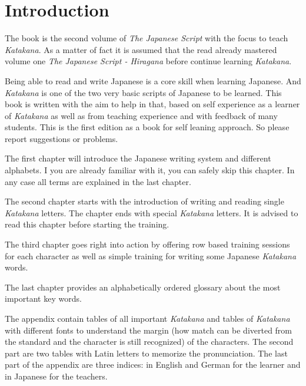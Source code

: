 \chapter*{Introduction}

The book is the second volume of \textit{The Japanese Script} with the focus to
teach \textit{Katakana}. As a matter of fact it is assumed that the read
already mastered volume one \textit{The Japanese Script - Hiragana} before
continue learning \textit{Katakana}. 

Being able to read and write Japanese is a core skill when learning Japanese.
And \textit{Katakana} is one of the two very basic scripts of Japanese to be
learned.  This book is written with the aim to help in that, based on self
experience as a learner of \textit{Katakana} as well as from teaching
experience and with feedback of many students. This is the first edition as a
book for self leaning approach.  So please report suggestions or problems. 

The first chapter will introduce the Japanese writing system and different
alphabets. I you are already familiar with it, you can safely skip this
chapter. In any case all terms are explained in the last chapter.

The second chapter starts with the introduction of writing and reading single
\textit{Katakana} letters. The chapter ends with special \textit{Katakana}
letters. It is advised to read this chapter before starting the training. 

The third chapter goes right into action by offering row based training
sessions for each character as well as simple training for writing some
Japanese \textit{Katakana} words.

The last chapter provides an alphabetically ordered glossary about the most
important key words.

The appendix contain tables of all important \textit{Katakana} and tables of
\textit{Katakana} with different fonts to understand the margin (how match can
be diverted from the standard and the character is still recognized) of the
characters. The second part are two tables with Latin letters to memorize the
pronunciation. The last part of the appendix are three indices: in English and
German for the learner and in Japanese for the teachers. 




